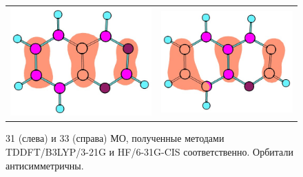 \begin{figure}[H]
\center
\begin{tabular}{cc}
\includegraphics[scale=0.35]{fig/TDDFT-31.jpg}
&
\includegraphics[scale=0.35]{fig/CIS-33.jpg}
\end{tabular}
\caption{31 (слева) и 33 (справа) МО, полученные методами TDDFT/B3LYP/3-21G и HF/6-31G-CIS соответственно. Орбитали антисимметричны.}
\end{figure}


